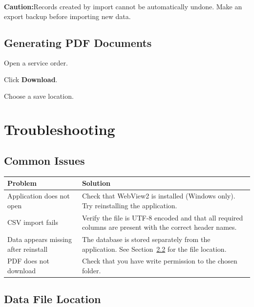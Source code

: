 \documentclass[12pt, a4paper]{report}
\newcommand{\dangerbox}[1]{%
	\vspace{6pt}
	\noindent
	\colorbox{DangerRed}{%
		\begin{minipage}{\dimexpr\linewidth-2\fboxsep}%
			\vspace{5pt}
			\small\textbf{\color{DangerBorder}Caution:\space}\color{Navy}#1
			\vspace{5pt}
		\end{minipage}%
	}
	\vspace{6pt}
}
\newcommand{\ui}[1]{\textbf{\color{Navy}#1}}
\begin{document}
	\dangerbox{Records created by import cannot be automatically undone.
		Make an export backup before importing new data.}
	
	\section{Generating PDF Documents}
	
	\begin{steps}
		\item Open a service order.
		\item Click \ui{Download}.
		\item Choose a save location.
	\end{steps}
	
	\chapter{Troubleshooting}
	
	\section{Common Issues}
	
	\begin{tabularx}{\textwidth}{l X}
		\toprule
		\textbf{Problem} & \textbf{Solution} \\
		\midrule
		Application does not open
		& Check that WebView2 is installed (Windows only).
		Try reinstalling the application. \\
		\addlinespace
		CSV import fails
		& Verify the file is UTF-8 encoded and that all required
		columns are present with the correct header names. \\
		\addlinespace
		Data appears missing after reinstall
		& The database is stored separately from the application.
		See Section~\ref{sec:dataLocation} for the file location. \\
		\addlinespace
		PDF does not download
		& Check that you have write permission to the chosen folder. \\
		\bottomrule
	\end{tabularx}
	
	\section{Data File Location}
	\label{sec:dataLocation}
	
\end{document}
